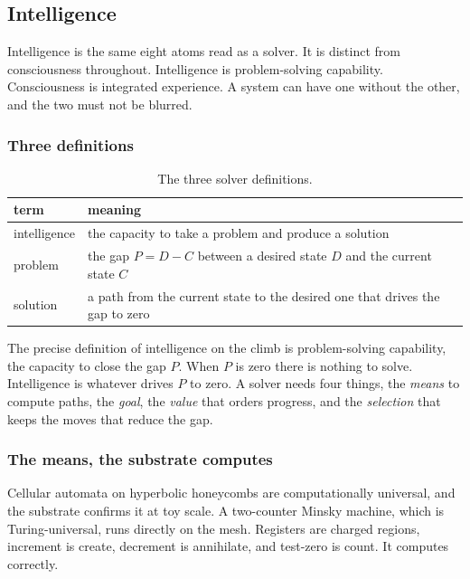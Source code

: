 \subsection{Intelligence}

Intelligence is the same eight atoms read as a solver. It is distinct from consciousness throughout. Intelligence is problem-solving capability. Consciousness is integrated experience. A system can have one without the other, and the two must not be blurred.

\subsubsection{Three definitions}

\begin{table}[ht]
\centering
\begin{tabular}{@{}ll@{}}
\toprule
term & meaning \\
\midrule
intelligence & the capacity to take a problem and produce a solution \\
problem & the gap $P = D - C$ between a desired state $D$ and the current state $C$ \\
solution & a path from the current state to the desired one that drives the gap to zero \\
\bottomrule
\end{tabular}
\caption{The three solver definitions.}
\label{tab:solver}
\end{table}

The precise definition of intelligence on the climb is problem-solving capability, the capacity to close the gap $P$. When $P$ is zero there is nothing to solve. Intelligence is whatever drives $P$ to zero. A solver needs four things, the \emph{means} to compute paths, the \emph{goal}, the \emph{value} that orders progress, and the \emph{selection} that keeps the moves that reduce the gap.

\subsubsection{The means, the substrate computes}

Cellular automata on hyperbolic honeycombs are computationally universal, and the substrate confirms it at toy scale. A two-counter Minsky machine, which is Turing-universal, runs directly on the mesh. Registers are charged regions, increment is create, decrement is annihilate, and test-zero is count. It computes correctly.

